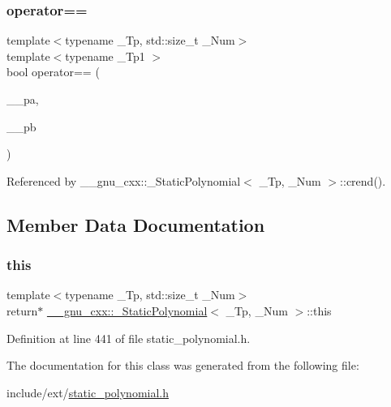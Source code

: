 \subsubsection{\texorpdfstring{operator==}{operator==}}
{\footnotesize\ttfamily template$<$typename \+\_\+\+Tp, std\+::size\+\_\+t \+\_\+\+Num$>$ \\
template$<$typename \+\_\+\+Tp1 $>$ \\
bool operator== (\begin{DoxyParamCaption}\item[{const \hyperlink{class____gnu__cxx_1_1__StaticPolynomial}{\+\_\+\+Static\+Polynomial}$<$ \+\_\+\+Tp1, \+\_\+\+Num $>$ \&}]{\+\_\+\+\_\+pa,  }\item[{const \hyperlink{class____gnu__cxx_1_1__StaticPolynomial}{\+\_\+\+Static\+Polynomial}$<$ \+\_\+\+Tp1, \+\_\+\+Num $>$ \&}]{\+\_\+\+\_\+pb }\end{DoxyParamCaption})\hspace{0.3cm}{\ttfamily [friend]}}



Referenced by \+\_\+\+\_\+gnu\+\_\+cxx\+::\+\_\+\+Static\+Polynomial$<$ \+\_\+\+Tp, \+\_\+\+Num $>$\+::crend().



\subsection{Member Data Documentation}
\mbox{\label{class____gnu__cxx_1_1__StaticPolynomial_a4de3c06513ac6f8677fe098213a89fff}} 
\subsubsection{\texorpdfstring{this}{this}}
{\footnotesize\ttfamily template$<$typename \+\_\+\+Tp, std\+::size\+\_\+t \+\_\+\+Num$>$ \\
return$\ast$ \hyperlink{class____gnu__cxx_1_1__StaticPolynomial}{\+\_\+\+\_\+gnu\+\_\+cxx\+::\+\_\+\+Static\+Polynomial}$<$ \+\_\+\+Tp, \+\_\+\+Num $>$\+::this}



Definition at line 441 of file static\+\_\+polynomial.\+h.



The documentation for this class was generated from the following file\+:\begin{DoxyCompactItemize}
\item 
include/ext/\hyperlink{static__polynomial_8h}{static\+\_\+polynomial.\+h}\end{DoxyCompactItemize}
